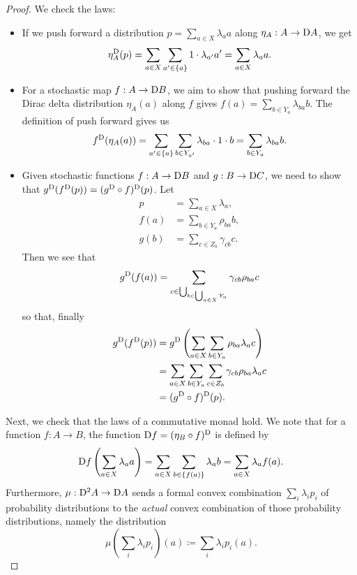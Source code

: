 \documentclass[DynamicalBook]{subfiles}
\begin{document}
\begin{proof}
  We check the laws:
  \begin{itemize}
  \item If we push forward a distribution $p = \sum_{a \in X}\lambda_a a$ along
    $\eta_A : A \to \mathrm{D} A$, we get
    \[
    \eta_A^{\mathrm{D}}(p) = \sum_{a \in X} \sum_{a' \in \{a\}} 1\cdot
    \lambda_{a'}  a' = \sum_{a \in X}\lambda_a a.
\]
  \item For a stochastic map $f : A \to \mathrm{D} B$, we aim to show that pushing
    forward the Dirac delta distribution $\eta_A(a)$ along $f$ gives $f(a) =
    \sum_{b \in Y_a} \lambda_{b a} b$. The definition of push forward gives us
    \[
f^{\mathrm{D}}(\eta_A(a)) = \sum_{a' \in \{a\}}\sum_{b \in Y_{a'}}
\lambda_{ba} \cdot 1 \cdot b = \sum_{b \in Y_a} \lambda_{ba} b.
    \]
   \item Given stochastic functions $f : A \to \mathrm{D} B$ and $g : B \to
     \mathrm{D} C$, we need to show that $g^{\mathrm{D}}(f^{\mathrm{D}}(p)) =
     (g^{\mathrm{D}}\circ f)^{\mathrm{D}}(p)$. Let
\begin{align*}
 p &= \sum_{a \in X} \lambda_{a}, \\
f(a) &= \sum_{b \in Y_a} \rho_{ba} b, \\
g(b) &= \sum_{c \in Z_b} \gamma_{cb} c.
\end{align*}
       Then we see that
       \[
g^{\mathrm{D}}(f(a)) = \sum_{c \in \bigcup_{b \in \bigcup_{a \in X} Y_a }} \gamma_{cb} \rho_{ba} c
       \]
       so that, finally
\begin{align*}
  g^{\mathrm{D}}(f^{\mathrm{D}}(p)) &= g^{\mathrm{D}}\left( \sum_{a \in X} \sum_{b \in Y_a} \rho_{ba} \lambda_a c \right) \\
                                &=  \sum_{a \in X} \sum_{b \in Y_a} \sum_{c \in Z_b} \gamma_{cb} \rho_{ba} \lambda_a c \\
  &= (g^{\mathrm{D}}\circ f)^{\mathrm{D}}(p). 
\end{align*}
  \end{itemize}

  Next, we check that the laws of a commutative monad hold. We note that for a
  function $f : A \to B$, the function $\mathrm{D} f = (\eta_B \circ
  f)^{\mathrm{D}}$ is defined by
  \[\mathrm{D} f\left( \sum_{a \in X} \lambda_a a \right) = \sum_{a \in X} \sum_{b
    \in \{f(a)\}} \lambda_a b = \sum_{a \in X} \lambda_a f(a).\]
  Furthermore, $\mu : \mathrm{D}^2 A \to \mathrm{D} A$ sends a formal convex
  combination $\sum_i \lambda_i p_i$ of probability distributions to the
  \emph{actual} convex combination of those probability distributions, namely
  the distribution
  \[
\mu\left( \sum_i \lambda_i p_i \right)(a) \coloneqq \sum_i \lambda_i p_i(a).
  \]
  

\end{proof}
\end{document}
